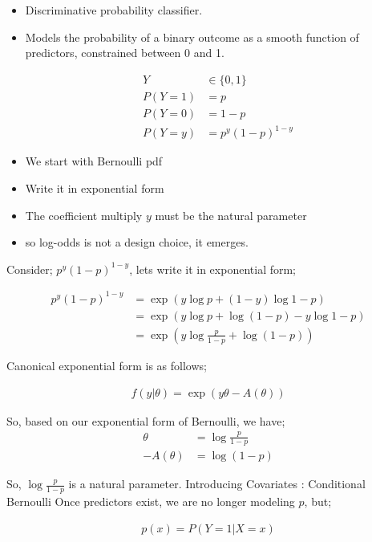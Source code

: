 \documentclass[10pt,a4paper]{article}
\begin{document}
	\begin{itemize}
		\item Discriminative probability classifier.
		\item Models the probability of a binary outcome as a smooth function of predictors, constrained between 0 and 1.


	\begin{align*}
			Y &\in \{0,1\}\\
			P(Y=1) &=p\\
			P(Y=0) &= 1-p\\
			P(Y=y) &= p^y(1-p)^{1-y}
	\end{align*}


		\item We start with Bernoulli pdf
		\item Write it in exponential form
		\item The coefficient multiply $y$ must be the natural parameter
		\item so log-odds is not a design choice, it emerges.
	\end{itemize}

	Consider; $p^y(1-p)^{1-y}$, lets write it in exponential form;


	\begin{align*}
			p^y(1-p)^{1-y}
			&= \exp(y\log{p} + (1-y)\log{1-p})\\
			&= \exp(y\log{p} + \log(1-p) - y\log{1-p})\\
			&= \exp\left(y\log{\frac{p}{1-p}}+ \log{(1-p)}\right)
	\end{align*}


		Canonical exponential form is as follows;

	\begin{align*}
			f(y|\theta) = \exp(y\theta - A(\theta))
	\end{align*}

		So, based on our exponential form of Bernoulli, we have;
	\begin{align*}
			\theta &= \log{\frac{p}{1-p}}\\
			-A(\theta) &= \log({1-p})
	\end{align*}


	So, $\log{\frac{p}{1-p}}$ is a natural parameter.
	Introducing Covariates : Conditional Bernoulli
	Once predictors exist, we are no longer modeling $p$, but;

	\begin{align*}
			p(x) = P(Y=1|X=x)
	\end{align*}
\end{document}
